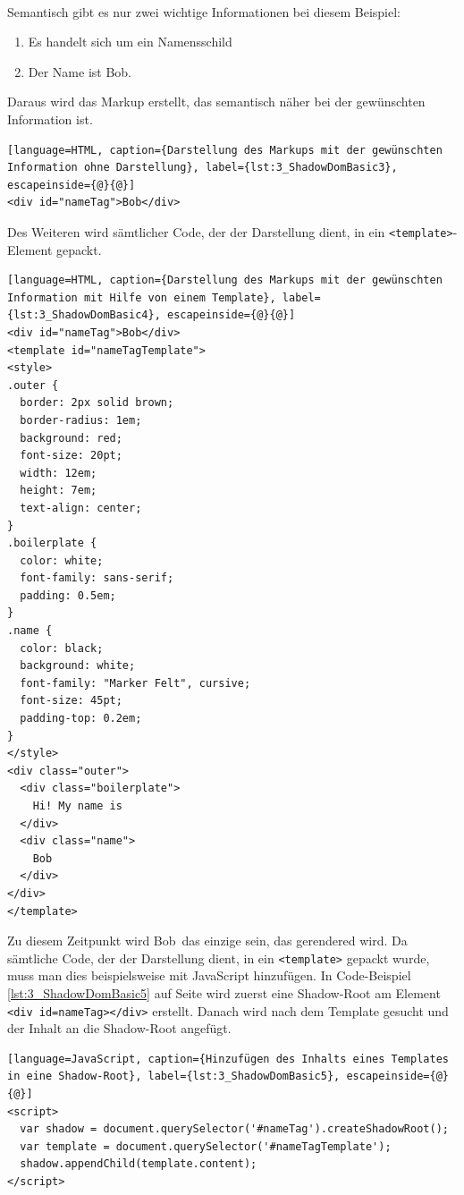 \begin{enumerate}
 \hfill \\
Semantisch gibt es nur zwei wichtige Informationen bei diesem Beispiel:
\begin{enumerate}
\item Es handelt sich um ein Namensschild
\item Der Name ist \glqq Bob\grqq .
\end{enumerate}
Daraus wird das Markup erstellt, das semantisch näher bei der gewünschten Information ist.

\begin{lstlisting}[language=HTML, caption={Darstellung des Markups mit der gewünschten Information ohne Darstellung}, label={lst:3_ShadowDomBasic3}, escapeinside={@}{@}]
<div id="nameTag">Bob</div>
\end{lstlisting}

Des Weiteren wird sämtlicher Code, der der Darstellung dient, in ein \lstinline|<template>|-Element gepackt.

\begin{lstlisting}[language=HTML, caption={Darstellung des Markups mit der gewünschten Information mit Hilfe von einem Template}, label={lst:3_ShadowDomBasic4}, escapeinside={@}{@}]
<div id="nameTag">Bob</div>
<template id="nameTagTemplate">
<style>
.outer {
  border: 2px solid brown;
  border-radius: 1em;
  background: red;
  font-size: 20pt;
  width: 12em;
  height: 7em;
  text-align: center;
}
.boilerplate {
  color: white;
  font-family: sans-serif;
  padding: 0.5em;
}
.name {
  color: black;
  background: white;
  font-family: "Marker Felt", cursive;
  font-size: 45pt;
  padding-top: 0.2em;
}
</style>
<div class="outer">
  <div class="boilerplate">
    Hi! My name is
  </div>
  <div class="name">
    Bob
  </div>
</div>
</template>
\end{lstlisting}

Zu diesem Zeitpunkt wird \glqq Bob\grqq\ das einzige sein, das gerendered wird. Da sämtliche Code, der der Darstellung dient, in ein \lstinline|<template>| gepackt wurde, muss man dies beispielsweise mit JavaScript hinzufügen. In Code-Beispiel \ref{lst:3_ShadowDomBasic5} auf Seite \pageref{lst:3_ShadowDomBasic5} wird zuerst eine Shadow-Root am Element \lstinline|<div id=nameTag></div>| erstellt. Danach wird nach dem Template gesucht und der Inhalt an die Shadow-Root angefügt.

\begin{lstlisting}[language=JavaScript, caption={Hinzufügen des Inhalts eines Templates in eine Shadow-Root}, label={lst:3_ShadowDomBasic5}, escapeinside={@}{@}]
<script>
  var shadow = document.querySelector('#nameTag').createShadowRoot();
  var template = document.querySelector('#nameTagTemplate');
  shadow.appendChild(template.content);
</script>
\end{lstlisting}


\end{enumerate}
